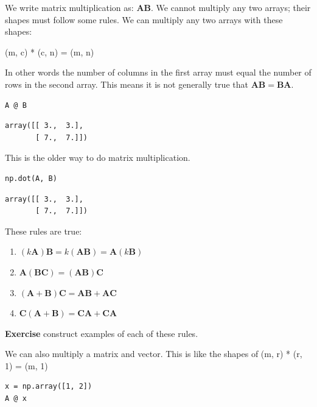 \documentclass[11pt]{article}
\begin{document}
We write matrix multiplication as: \(\mathbf{A} \mathbf{B}\). We cannot multiply any two arrays; their shapes must follow some rules. We can multiply any two arrays with these shapes:

(m, c) * (c, n) = (m, n)

In other words the number of columns in the first array must equal the number of rows in the second array. This means it is not generally true that \(\mathbf{A} \mathbf{B} = \mathbf{B} \mathbf{A}\).

\begin{verbatim}
A @ B
\end{verbatim}

\begin{verbatim}
array([[ 3.,  3.],
       [ 7.,  7.]])
\end{verbatim}

This is the older way to do matrix multiplication.

\begin{verbatim}
np.dot(A, B)
\end{verbatim}

\begin{verbatim}
array([[ 3.,  3.],
       [ 7.,  7.]])
\end{verbatim}

These rules are true:

\begin{enumerate}
\item \((k \mathbf{A})\mathbf{B} = k(\mathbf{A} \mathbf{B}) = \mathbf{A}(k\mathbf{B})\)
\item \(\mathbf{A}(\mathbf{B}\mathbf{C}) = (\mathbf{A}\mathbf{B})\mathbf{C}\)
\item \((\mathbf{A} + \mathbf{B})\mathbf{C} = \mathbf{A}\mathbf{B} + \mathbf{A}\mathbf{C}\)
\item \(\mathbf{C}(\mathbf{A} + \mathbf{B}) = \mathbf{C}\mathbf{A} + \mathbf{C}\mathbf{A}\)
\end{enumerate}

\textbf{Exercise} construct examples of each of these rules.

We can also multiply a matrix and vector. This is like the shapes of (m, r) * (r, 1) = (m, 1)

\begin{verbatim}
x = np.array([1, 2])
A @ x
\end{verbatim}
\end{document}
